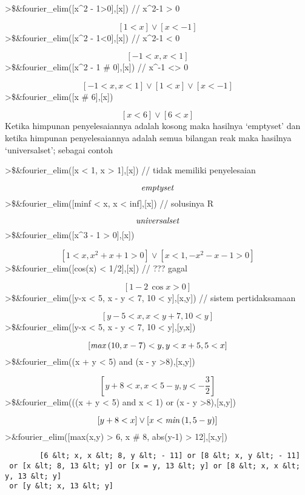 \documentclass[
]{book}
\begin{document}
\textgreater\$\&fourier\_elim({[}x\^{}2 - 1\textgreater0{]},{[}x{]}) // x\^{}2-1 \textgreater{} 0

\[\left[ 1<x \right] \lor \left[ x<-1 \right]\]\textgreater\$\&fourier\_elim({[}x\^{}2 - 1\textless0{]},{[}x{]}) // x\^{}2-1 \textless{} 0

\[\left[ -1<x , x<1 \right]\]\textgreater\$\&fourier\_elim({[}x\^{}2 - 1 \# 0{]},{[}x{]}) // x\^{}-1 \textless\textgreater{} 0

\[\left[ -1<x , x<1 \right] \lor \left[ 1<x \right] \lor \left[ x<-1 \right]\]\textgreater\$\&fourier\_elim({[}x \# 6{]},{[}x{]})

\[\left[ x<6 \right] \lor \left[ 6<x \right]\]Ketika himpunan penyelesaiannya adalah kosong maka hasilnya `emptyset' dan ketika himpunan penyelesaiannya adalah semua bilangan reak maka hasilnya `universalset'; sebagai contoh

\textgreater\$\&fourier\_elim({[}x \textless{} 1, x \textgreater{} 1{]},{[}x{]}) // tidak memiliki penyelesaian

\[{\it emptyset}\]\textgreater\$\&fourier\_elim({[}minf \textless{} x, x \textless{} inf{]},{[}x{]}) // solusinya R

\[{\it universalset}\]\textgreater\$\&fourier\_elim({[}x\^{}3 - 1 \textgreater{} 0{]},{[}x{]})

\[\left[ 1<x , x^2+x+1>0 \right] \lor \left[ x<1 , -x^2-x-1>0 \right]\]\textgreater\$\&fourier\_elim({[}cos(x) \textless{} 1/2{]},{[}x{]}) // ??? gagal

\[\left[ 1-2\,\cos x>0 \right]\]\textgreater\$\&fourier\_elim({[}y-x \textless{} 5, x - y \textless{} 7, 10 \textless{} y{]},{[}x,y{]}) // sistem pertidaksamaan

\[\left[ y-5<x , x<y+7 , 10<y \right] \]\textgreater\$\&fourier\_elim({[}y-x \textless{} 5, x - y \textless{} 7, 10 \textless{} y{]},{[}y,x{]})

\[\left[ {\it max}\left(10 , x-7\right)<y , y<x+5 , 5<x \right]\]\textgreater\$\&fourier\_elim((x + y \textless{} 5) and (x - y \textgreater8),{[}x,y{]})

\[\left[ y+8<x , x<5-y , y<-\frac{3}{2} \right]\]\textgreater\$\&fourier\_elim(((x + y \textless{} 5) and x \textless{} 1) or (x - y \textgreater8),{[}x,y{]})

\[\left[ y+8<x \right] \lor \left[ x<{\it min}\left(1 , 5-y\right)\right]\]\textgreater\&fourier\_elim({[}max(x,y) \textgreater{} 6, x \# 8, abs(y-1) \textgreater{} 12{]},{[}x,y{]})

\begin{verbatim}
        [6 &lt; x, x &lt; 8, y &lt; - 11] or [8 &lt; x, y &lt; - 11]
 or [x &lt; 8, 13 &lt; y] or [x = y, 13 &lt; y] or [8 &lt; x, x &lt; y, 13 &lt; y]
 or [y &lt; x, 13 &lt; y]
\end{verbatim}
\end{document}
